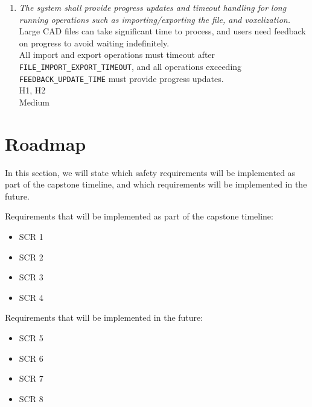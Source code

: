 \documentclass{article}
\begin{document}
\begin{enumerate}
\item \emph{The system shall provide progress updates and timeout handling for long running operations such as importing/exporting the file, and voxelization.}\\
     Large CAD files can take significant time to process, and users need feedback on progress to avoid waiting indefinitely.\\
     All import and export operations must timeout after \texttt{FILE\_IMPORT\_EXPORT\_TIMEOUT}, and all operations exceeding \texttt{FEEDBACK\_UPDATE\_TIME} must provide progress updates.\\
     H1, H2\\
     Medium

\end{enumerate}

\iffalse
\wss{Newly discovered requirements.  These should also be added to the SRS.  (A
rationale design process how and why to fake it.)}
\fi

\section{Roadmap}

In this section, we will state which safety requirements will be implemented as part of the capstone timeline, and which requirements will be implemented in the future.

Requirements that will be implemented as part of the capstone timeline:
\begin{itemize}
    \item SCR 1
    \item SCR 2
    \item SCR 3
    \item SCR 4
\end{itemize}
Requirements that will be implemented in the future:
\begin{itemize}
    \item SCR 5
    \item SCR 6
    \item SCR 7
    \item SCR 8
\end{itemize}

\iffalse
\wss{Which safety requirements will be implemented as part of the capstone timeline?
Which requirements will be implemented in the future?}
\fi


\newpage{}
\end{document}
